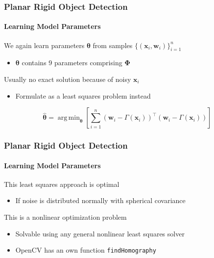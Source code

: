 \documentclass[xetex,professionalfont]{beamer}
\DeclareMathOperator*{\argmin}{arg\,min}
\renewcommand{\vec}[1]{\ensuremath{\mathbf{#1}}}
\newcommand{\vw}{\vec{w}}
\newcommand{\vx}{\vec{x}}
\newcommand{\bth}{\boldsymbol{\theta}}
\renewcommand\emph[1]{\textcolor{tuwcvl_inf_red}{#1}}
\begin{document}
\begin{frame}
\frametitle{Planar Rigid Object Detection}
\framesubtitle{Learning Model Parameters}

We again learn parameters $\bth$ from samples $\{(\vx_i,\vw_i)\}_{i=1}^n$
\begin{itemize}
	\item $\bth$ contains 9 parameters comprising $\boldsymbol{\Phi}$ %
\end{itemize}

\bigskip
Usually no exact solution because of noisy $\vx_i$
\begin{itemize}
	\item Formulate as a \emph{least squares problem} instead
\end{itemize}

\[
	\hat{\bth}=\argmin_{\bth} \left[\sum_{i=1}^n (\vw_i-\Gamma(\vx_i))^\top(\vw_i-\Gamma(\vx_i)) \right]
\]

\end{frame}


\begin{frame}
\frametitle{Planar Rigid Object Detection}
\framesubtitle{Learning Model Parameters}

This least squares approach is optimal
\begin{itemize}
	\item If noise is distributed normally with spherical covariance %
\end{itemize}

\bigskip
This is a nonlinear optimization problem
\begin{itemize}
	\item Solvable using any general nonlinear least squares solver %
	\item OpenCV has an own function \texttt{findHomography}
\end{itemize}

\end{frame}

\end{document}
